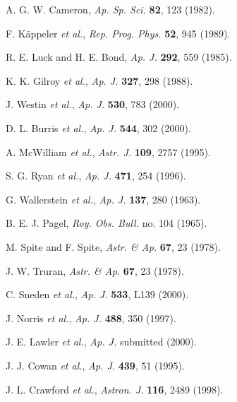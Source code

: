 \documentclass{ws-p8-50x6-00}
\begin{document}
\begin{thebibliography}{99}

A. G. W. Cameron, {\it Ap. Sp. Sci.} {\bf 82}, 123 (1982).

F. K{\"a}ppeler {\it et al.}, {\it Rep. Prog. Phys.} 
              {\bf 52}, 945 (1989).

R. E. Luck and H. E. Bond, {\it Ap. J.} {\bf 292}, 559 (1985).

K. K. Gilroy {\it et al.}, {\it Ap. J.} {\bf 327}, 298 (1988).

J. Westin {\it et al.}, {\it Ap. J.} {\bf 530}, 783 (2000).

D. L. Burris {\it et al.}, {\it Ap. J.} {\bf 544}, 302 (2000).

A. McWilliam {\it et al.}, {\it Astr. J.} {\bf 109}, 2757 (1995).

S. G. Ryan {\it et al.}, {\it Ap. J.} {\bf 471}, 254 (1996).

G. Wallerstein {\it et al.}, {\it Ap. J.} {\bf 137}, 280 (1963).

B. E. J. Pagel, {\it Roy. Obs. Bull.} no. 104 (1965).

M. Spite and F. Spite, {\it Astr. \& Ap.} {\bf 67}, 23 (1978).

J. W. Truran, {\it Astr. \& Ap.} {\bf 67}, 23 (1978).

C. Sneden {\it et al.}, {\it Ap. J.} {\bf 533}, L139 (2000).

J. Norris {\it et al.}, {\it Ap. J.} {\bf 488}, 350 (1997).

J. E. Lawler {\it et al.}, {\it Ap. J.} submitted (2000).

J. J. Cowan {\it et al.}, {\it Ap. J.} {\bf 439}, 51 (1995).

J. L. Crawford {\it et al.}, {\it Astron. J.} 
              {\bf 116}, 2489 (1998).

\end{thebibliography}
\end{document}
